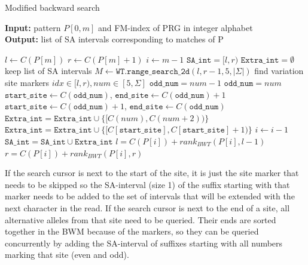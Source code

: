 \documentclass[runningheads,a4paper]{llncs}
\begin{document}
\begin{algorithm}[H]
\caption{Modified backward search} \label{bsearch}
\textbf{Input:} \textrm{pattern} $P[0,m]$ \textrm{and FM-index of PRG in integer alphabet}\\
\textbf{Output:} \textrm{list of SA intervals corresponding to matches of P} 
\begin{algorithmic}[1]
\State $l \gets C(P[m])$
\State $r \gets C(P[m]+1)$
\State $i \gets m-1$
\State $\texttt{SA\char`_int}={[l,r)}$
\State $\texttt{Extra\char`_int}=\emptyset$   \Comment keep list of SA intervals
\ForAll {$[l,r) \in \texttt{SA\char`_int}$} 
\State $M \gets \texttt{WT.range\char`_search\char`_2d} (l,r-1,5,|\Sigma|)$ \Comment find variation site markers
  \Comment $ idx\in [l,r), num\in[5,\Sigma]$
\State $\texttt{odd\char`_num}=num-1$
\Else
\State $\texttt{odd\char`_num}=num$
\EndIf
{}
\State $\texttt{start\char`_site} \gets C(\texttt{odd\char`_num})$, $\texttt{end\char`_site} \gets C(\texttt{odd\char`_num})+1$
\Else 
\State $\texttt{start\char`_site} \gets C(\texttt{odd\char`_num})+1$, $\texttt{end\char`_site} \gets C(\texttt{odd\char`_num})$
\EndIf
{}
\State $\texttt{Extra\char`_int}=\texttt{Extra\char`_int} \cup \{[C(num),C(num+2))\}$
\Else
\State $\texttt{Extra\char`_int}=\texttt{Extra\char`_int} \cup \{[C[\texttt{start\char`_site}], C[\texttt{start\char`_site}]+1)\}$
\EndIf
\EndFor
\EndFor
\State $i \gets i-1$
\State $\texttt{SA\char`_int}=\texttt{SA\char`_int} \cup \texttt{Extra\char`_int}$
\ForAll {$[l,r) \in \texttt{SA\char`_int}$} 
\State $l=C(P[i])+rank_{BWT}(P[i],l-1)$
\State $r=C(P[i])+rank_{BWT}(P[i],r)$
\EndFor
\EndWhile
\end {algorithmic}
\end{algorithm}


If the search cursor is next to the start of the site, it is just the site marker that needs to be skipped so the SA-interval (size 1) of the suffix starting with that marker needs to be added to the set of intervals that will be extended with the next character in the read. If the search cursor is next to the end of a site, all alternative alleles from that site need to be queried. Their ends are sorted together in the BWM because of the markers, so they can be queried concurrently by adding the SA-interval of suffixes starting with all numbers marking that site (even and odd). 
\end{document}
